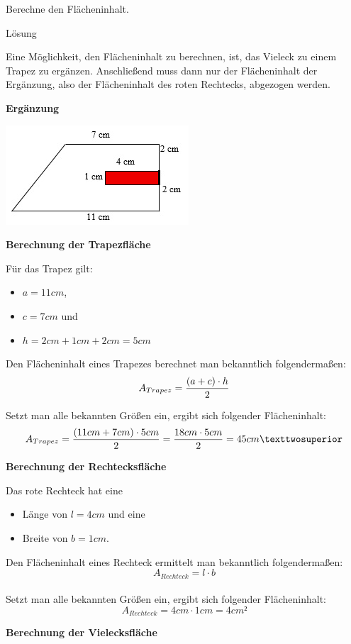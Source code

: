 \documentclass[
  ngerman,
]{book}
\providecommand{\tightlist}{%
  \setlength{\itemsep}{0pt}\setlength{\parskip}{0pt}}
\begin{document}
Berechne den Flächeninhalt.

Lösung

Eine Möglichkeit, den Flächeninhalt zu berechnen, ist, das Vieleck zu einem Trapez zu ergänzen. Anschließend muss dann nur der Flächeninhalt der Ergänzung, also der Flächeninhalt des roten Rechtecks, abgezogen werden.

\textbf{Ergänzung}

\includegraphics{./Bilder/VieleckL1.png}

\textbf{Berechnung der Trapezfläche}

Für das Trapez gilt:

\begin{itemize}
\tightlist
\item
  \(a= 11 cm\),
\item
  \(c= 7cm\) und
\item
  \(h = 2cm + 1cm + 2cm = 5cm\)
\end{itemize}

Den Flächeninhalt eines Trapezes berechnet man bekanntlich folgendermaßen:
\[A_{Trapez} = {(a+c) \cdot h \over 2}\]

Setzt man alle bekannten Größen ein, ergibt sich folgender Flächeninhalt:
\[ A_{Trapez} = {(11 cm + 7 cm) \cdot 5 cm \over 2} = {18 cm \cdot 5 cm \over 2} = 45 cm²\]

\textbf{Berechnung der Rechtecksfläche}

Das rote Rechteck hat eine

\begin{itemize}
\tightlist
\item
  Länge von \(l = 4cm\) und eine
\item
  Breite von \(b = 1cm\).
\end{itemize}

Den Flächeninhalt eines Rechteck ermittelt man bekanntlich folgendermaßen:
\[A_{Rechteck} = l \cdot b\]\\
Setzt man alle bekannten Größen ein, ergibt sich folgender Flächeninhalt:
\[ A_{Rechteck} = 4 cm \cdot 1cm = 4 cm²\]

\textbf{Berechnung der Vielecksfläche}
\end{document}
